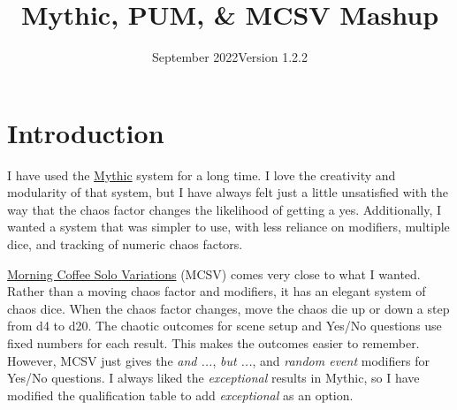 \usepackage[english]{babel}
\usepackage[utf8]{inputenc}
\usepackage[singlelinecheck=false]{caption}
\usepackage{lipsum}
\usepackage{listings}
\usepackage{shortvrb}
\usepackage{stfloats}
\usepackage{hyperref}


\MakeShortVerb{|}


\title{Mythic, PUM, \& MCSV Mashup}
\date{September 2022\newline{}Version 1.2.2}



\mainmatter
\section{Introduction}
I have used the \href{https://www.wordmillgames.com/mythic-gme.html}{Mythic}
system for a long time. I love the creativity and modularity of that system,
but I have always felt just a little unsatisfied with the way that the chaos
factor changes the likelihood of getting a yes. Additionally, I wanted a system
that was simpler to use, with less reliance on modifiers, multiple dice, and
tracking of numeric chaos factors.

\href{https://aleaiactandaest.blogspot.com/p/downloads.html}{Morning Coffee Solo
Variations} (MCSV) comes very close to what I wanted. Rather than a moving chaos
factor and modifiers, it has an elegant system of chaos dice. When the chaos
factor changes, move the chaos die up or down a step from d4 to d20. The chaotic
outcomes for scene setup and Yes/No questions use fixed numbers for each result.
This makes the outcomes easier to remember. However, MCSV just gives the
\emph{and ...}, \emph{but ...}, and \emph{random event} modifiers for Yes/No
questions. I always liked the \emph{exceptional} results in Mythic, so I have
modified the qualification table to add \emph{exceptional} as an option.

